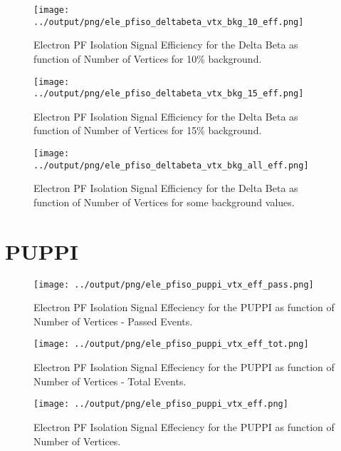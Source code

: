 \documentclass[11pt]{book}
\begin{document}
\begin{figure}[htb]
\centering
\texttt{[image: ../output/png/ele\_pfiso\_deltabeta\_vtx\_bkg\_10\_eff.png]}
\caption{Electron PF Isolation Signal Efficiency for the Delta Beta as function of Number of Vertices for 10\% background.}
\label{fig:ele_pfiso_vtx_eff_deltabeta_bkg_10_eff}
\end{figure}

\begin{figure}[htb]
\centering
\texttt{[image: ../output/png/ele\_pfiso\_deltabeta\_vtx\_bkg\_15\_eff.png]}
\caption{Electron PF Isolation Signal Efficiency for the Delta Beta as function of Number of Vertices for 15\% background.}
\label{fig:ele_pfiso_vtx_eff_deltabeta_bkg_15_eff}
\end{figure}

\begin{figure}[htb]
\centering
\texttt{[image: ../output/png/ele\_pfiso\_deltabeta\_vtx\_bkg\_all\_eff.png]}
\caption{Electron PF Isolation Signal Efficiency for the Delta Beta as function of Number of Vertices for some background values.}
\label{fig:ele_pfiso_vtx_eff_deltabeta_bkg_all_eff}
\end{figure}
\clearpage

\section{PUPPI}
\begin{figure}[htb]
\centering
\texttt{[image: ../output/png/ele\_pfiso\_puppi\_vtx\_eff\_pass.png]}
\caption{Electron PF Isolation Signal Effeciency for the PUPPI as function of Number of Vertices - Passed Events.}
\label{fig:ele_pfiso_vtx_eff_puppi_pass}
\end{figure}

\begin{figure}[htb]
\centering
\texttt{[image: ../output/png/ele\_pfiso\_puppi\_vtx\_eff\_tot.png]}
\caption{Electron PF Isolation Signal Effeciency for the PUPPI as function of Number of Vertices - Total Events.}
\label{fig:ele_pfiso_vtx_eff_puppi_tot}
\end{figure}

\begin{figure}[htb]
\centering
\texttt{[image: ../output/png/ele\_pfiso\_puppi\_vtx\_eff.png]}
\caption{Electron PF Isolation Signal Effeciency for the PUPPI as function of Number of Vertices.}
\label{fig:ele_pfiso_vtx_eff_puppi}
\end{figure}
\end{document}
